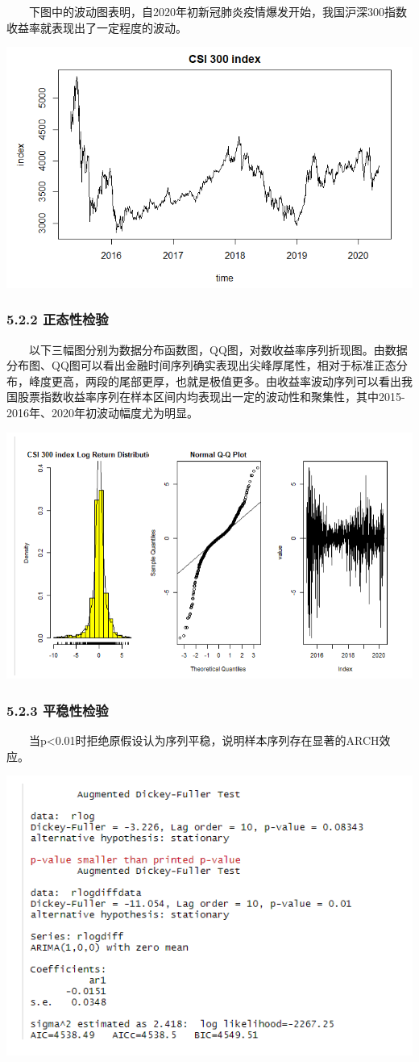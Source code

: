 \documentclass[
  11pt,
  letterpaper,
]{article}
\begin{document}
  下图中的波动图表明，自2020年初新冠肺炎疫情爆发开始，我国沪深300指数收益率就表现出了一定程度的波动。

\includegraphics[width=0.7\linewidth]{./9}

\hypertarget{ux6b63ux6001ux6027ux68c0ux9a8c}{%
\subsubsection{5.2.2 正态性检验}\label{ux6b63ux6001ux6027ux68c0ux9a8c}}

  以下三幅图分别为数据分布函数图，QQ图，对数收益率序列折现图。由数据分布图、QQ图可以看出金融时间序列确实表现出尖峰厚尾性，相对于标准正态分布，峰度更高，两段的尾部更厚，也就是极值更多。由收益率波动序列可以看出我国股票指数收益率序列在样本区间内均表现出一定的波动性和聚集性，其中2015-2016年、2020年初波动幅度尤为明显。

\includegraphics[width=0.7\linewidth]{./10}

\hypertarget{ux5e73ux7a33ux6027ux68c0ux9a8c}{%
\subsubsection{5.2.3 平稳性检验}\label{ux5e73ux7a33ux6027ux68c0ux9a8c}}

  当p\textless0.01时拒绝原假设认为序列平稳，说明样本序列存在显著的ARCH效应。

\includegraphics[width=0.7\linewidth]{./11}
\end{document}
